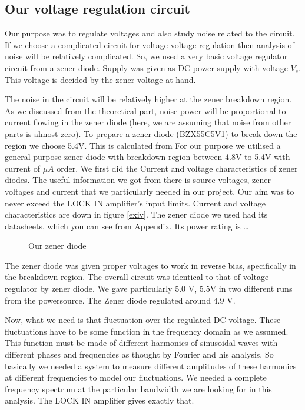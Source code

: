 
\subsection{Our voltage regulation circuit}

Our purpose was to regulate voltages and also study noise related to the circuit. If we choose a complicated circuit for voltage voltage regulation then analysis of noise will be relatively complicated. So, we used a very basic voltage regulator circuit from a zener diode. Supply was given as DC power supply with voltage $V_{s}$. This voltage is decided by the zener voltage at hand.

The noise in the circuit will be relatively higher at the zener breakdown region. As we discussed from the theoretical part, noise power will be proportional to current flowing in the zener diode (here, we are assuming that noise from other parts is almost zero). To prepare a zener diode (BZX55C5V1) to break down the region we choose 5.4V. This is calculated from 
For our purpose we utilised a general purpose zener diode with breakdown region between 4.8V to 5.4V with current of $\mu A$ order. We first did the Current and voltage characteristics of zener diodes. The useful information we got from there is source voltages, zener voltages and current that we particularly needed in our project. Our aim was to never exceed the LOCK IN amplifier’s input limits. Current and voltage characteristics are down in figure \ref{exiv}. The zener diode we used had its datasheets, which you can see from Appendix. Its power rating is … 

\begin{figure}[hbt!]
\caption{Our zener diode}
\end{figure}

The zener diode was given proper voltages to work in reverse bias, specifically in the breakdown region. The overall circuit was identical to that of voltage regulator by zener diode. We gave particularly 5.0 V, 5.5V in two different runs from the powersource. The Zener diode regulated around 4.9 V. 

\begin{figure*}[hbt!]
\caption{current and voltage characterists of zener diode \label{exiv}}
\end{figure*}

Now, what we need is that fluctuation over the regulated DC voltage. These fluctuations have to be some function in the frequency domain as we assumed. This function must be made of different harmonics of sinusoidal waves with different phases and frequencies as thought by Fourier and his analysis. So basically we needed a system to measure different amplitudes of these harmonics at different frequencies to model our fluctuations. We needed a complete frequency spectrum at the particular bandwidth we are looking for in this analysis. The LOCK IN amplifier gives exactly that. 


